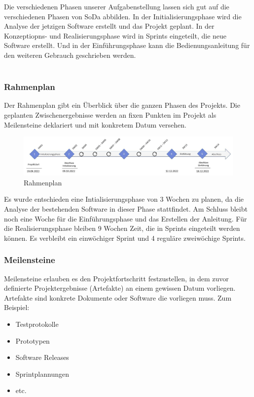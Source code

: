 \documentclass[a4paper, table]{article}
\begin{document}
Die verschiedenen Phasen unserer Aufgabenstellung lassen sich gut auf die verschiedenen Phasen von SoDa abbilden.
In der Initialisierungsphase wird die Analyse der jetzigen Software erstellt und das Projekt geplant.
In der Konzeptiopns- und Realisierungsphase wird in Sprints eingeteilt, die neue Software erstellt.
Und in der Einführungsphase kann die Bedienungsanleitung für den weiteren Gebrauch geschrieben werden.\\\\

\subsubsection{Rahmenplan}
Der Rahmenplan gibt ein Überblick über die ganzen Phasen des Projekts.
Die geplanten Zwischenergebnisse werden an fixen Punkten im Projekt als Meilensteine deklariert und mit konkretem Datum versehen.

\begin{figure}[h]
    \centering
    \hspace*{-2cm}
    \includegraphics[width=1.3\textwidth]{img/Rahmenplan.jpg}
    \caption{Rahmenplan}
    \label{fig:Rahmenplan}
\end{figure}
Es wurde entschieden eine Intialisierungsphase von 3 Wochen zu planen, da die Analyse der bestehenden Software in dieser Phase stattfindet.
Am Schluss bleibt noch eine Woche für die Einführungsphase und das Erstellen der Anleitung.
Für die Realisierungsphase bleiben 9 Wochen Zeit, die in Sprints eingeteilt werden können.
Es verbleibt ein einwöchiger Sprint und 4 reguläre zweiwöchige Sprints.
\newpage
\subsubsection*{Meilensteine}
Meilensteine erlauben es den Projektfortschritt festzustellen,
in dem zuvor definierte Projektergebnisse (Artefakte) an einem gewissen Datum vorliegen.\\
Artefakte sind konkrete Dokumente oder Software die vorliegen muss. Zum Beispiel:
\begin{itemize}
    \item Testprotokolle
    \item Prototypen
    \item Software Releases
    \item Sprintplannungen
    \item etc.
\end{itemize}
\end{document}
